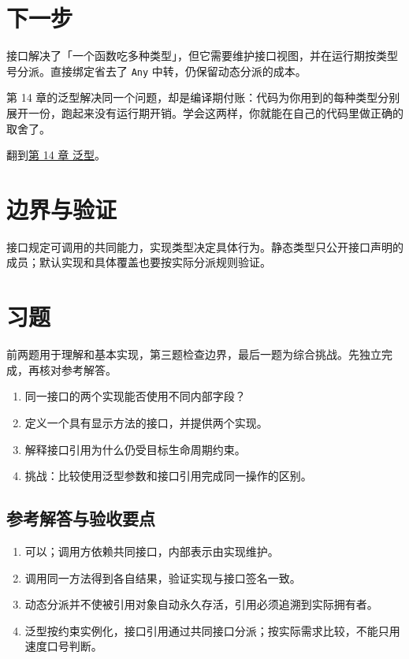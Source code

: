 \section{下一步}

接口解决了「一个函数吃多种类型」，但它需要维护接口视图，并在运行期按类型号分派。直接绑定省去了 \texttt{Any} 中转，仍保留动态分派的成本。

第 14 章的泛型解决同一个问题，却是编译期付账：代码为你用到的每种类型分别展开一份，跑起来没有运行期开销。学会这两样，你就能在自己的代码里做正确的取舍了。

翻到\hyperref[ch:14]{第 14 章 泛型}。

\section{边界与验证}

接口规定可调用的共同能力，实现类型决定具体行为。静态类型只公开接口声明的成员；默认实现和具体覆盖也要按实际分派规则验证。

\section{习题}

前两题用于理解和基本实现，第三题检查边界，最后一题为综合挑战。先独立完成，再核对参考解答。

\begin{enumerate}

\item 同一接口的两个实现能否使用不同内部字段？

\item 定义一个具有显示方法的接口，并提供两个实现。

\item 解释接口引用为什么仍受目标生命周期约束。

\item 挑战：比较使用泛型参数和接口引用完成同一操作的区别。

\end{enumerate}

\subsection*{参考解答与验收要点}

\begin{enumerate}

\item 可以；调用方依赖共同接口，内部表示由实现维护。

\item 调用同一方法得到各自结果，验证实现与接口签名一致。

\item 动态分派并不使被引用对象自动永久存活，引用必须追溯到实际拥有者。

\item 泛型按约束实例化，接口引用通过共同接口分派；按实际需求比较，不能只用速度口号判断。

\end{enumerate}

